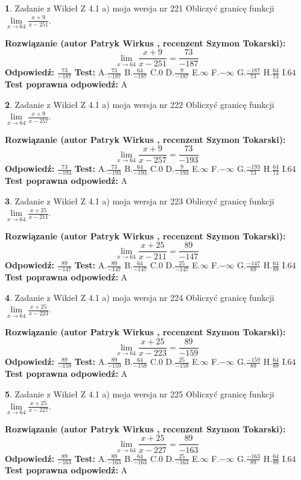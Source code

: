 \documentclass[12pt, a4paper]{article}
\theoremstyle{definition} %
\newtheorem{zad}{}
\newcommand{\zadStart}[1]{\begin{zad}#1\newline}
\newcommand{\zadStop}{\end{zad}}
\newcommand{\rozwStart}[2]{\noindent \textbf{Rozwiązanie (autor #1 , recenzent #2): }\newline}
\newcommand{\rozwStop}{\newline}
\newcommand{\odpStart}{\noindent \textbf{Odpowiedź:}\newline}
\newcommand{\odpStop}{\newline}
\newcommand{\testStart}{\noindent \textbf{Test:}\newline}
\newcommand{\testStop}{\newline}
\newcommand{\kluczStart}{\noindent \textbf{Test poprawna odpowiedź:}\newline}
\newcommand{\kluczStop}{\newline}
\begin{document}
\zadStart{Zadanie z Wikieł Z 4.1 a) moja wersja nr 221}
Obliczyć granicę funkcji $\lim\limits_{x\to64}\frac{x+9}{x-251}$.
\zadStop
\rozwStart{Patryk Wirkus}{Szymon Tokarski}
$$\lim\limits_{x\to64}\frac{x+9}{x-251} = \frac{73}{-187}$$
\rozwStop
\odpStart
$\frac{73}{-187}$
\odpStop
\testStart
A.$\frac{73}{-187}$
B.$\frac{64}{-187}$
C.$0$
D.$\frac{9}{-187}$
E.$\infty$
F.$-\infty$
G.$\frac{-187}{73}$
H.$\frac{64}{73}$
I.$64$
\testStop
\kluczStart
A
\kluczStop



\zadStart{Zadanie z Wikieł Z 4.1 a) moja wersja nr 222}
Obliczyć granicę funkcji $\lim\limits_{x\to64}\frac{x+9}{x-257}$.
\zadStop
\rozwStart{Patryk Wirkus}{Szymon Tokarski}
$$\lim\limits_{x\to64}\frac{x+9}{x-257} = \frac{73}{-193}$$
\rozwStop
\odpStart
$\frac{73}{-193}$
\odpStop
\testStart
A.$\frac{73}{-193}$
B.$\frac{64}{-193}$
C.$0$
D.$\frac{9}{-193}$
E.$\infty$
F.$-\infty$
G.$\frac{-193}{73}$
H.$\frac{64}{73}$
I.$64$
\testStop
\kluczStart
A
\kluczStop



\zadStart{Zadanie z Wikieł Z 4.1 a) moja wersja nr 223}
Obliczyć granicę funkcji $\lim\limits_{x\to64}\frac{x+25}{x-211}$.
\zadStop
\rozwStart{Patryk Wirkus}{Szymon Tokarski}
$$\lim\limits_{x\to64}\frac{x+25}{x-211} = \frac{89}{-147}$$
\rozwStop
\odpStart
$\frac{89}{-147}$
\odpStop
\testStart
A.$\frac{89}{-147}$
B.$\frac{64}{-147}$
C.$0$
D.$\frac{25}{-147}$
E.$\infty$
F.$-\infty$
G.$\frac{-147}{89}$
H.$\frac{64}{89}$
I.$64$
\testStop
\kluczStart
A
\kluczStop



\zadStart{Zadanie z Wikieł Z 4.1 a) moja wersja nr 224}
Obliczyć granicę funkcji $\lim\limits_{x\to64}\frac{x+25}{x-223}$.
\zadStop
\rozwStart{Patryk Wirkus}{Szymon Tokarski}
$$\lim\limits_{x\to64}\frac{x+25}{x-223} = \frac{89}{-159}$$
\rozwStop
\odpStart
$\frac{89}{-159}$
\odpStop
\testStart
A.$\frac{89}{-159}$
B.$\frac{64}{-159}$
C.$0$
D.$\frac{25}{-159}$
E.$\infty$
F.$-\infty$
G.$\frac{-159}{89}$
H.$\frac{64}{89}$
I.$64$
\testStop
\kluczStart
A
\kluczStop



\zadStart{Zadanie z Wikieł Z 4.1 a) moja wersja nr 225}
Obliczyć granicę funkcji $\lim\limits_{x\to64}\frac{x+25}{x-227}$.
\zadStop
\rozwStart{Patryk Wirkus}{Szymon Tokarski}
$$\lim\limits_{x\to64}\frac{x+25}{x-227} = \frac{89}{-163}$$
\rozwStop
\odpStart
$\frac{89}{-163}$
\odpStop
\testStart
A.$\frac{89}{-163}$
B.$\frac{64}{-163}$
C.$0$
D.$\frac{25}{-163}$
E.$\infty$
F.$-\infty$
G.$\frac{-163}{89}$
H.$\frac{64}{89}$
I.$64$
\testStop
\kluczStart
A
\kluczStop
\end{document}
